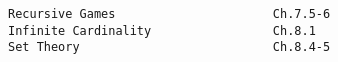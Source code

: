 \documentclass[handout]{mcs}
\begin{document}
\renewcommand{\reading}{
\begin{itemize}

\item Chapter~\bref{recursive_data_chap}. \emph{Recursive Data}
\item Chapter~\bref{infinite_chap}. \emph{Infinite Cardinality, Diagonal Arguments, Set Theory}


 \end{itemize}}


\begin{staffnotes}
\begin{verbatim}
Recursive Games                      Ch.7.5-6
Infinite Cardinality                 Ch.8.1
Set Theory                           Ch.8.4-5              
\end{verbatim}
\end{staffnotes}








\end{document}
